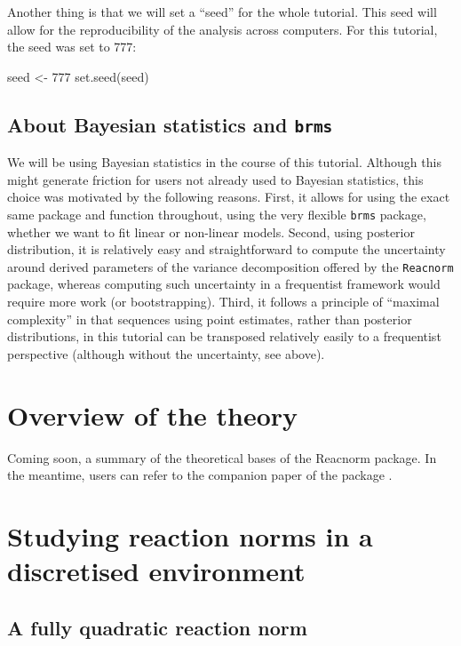 \documentclass[a4paper,12pt,twoside]{article}
\begin{document}
Another thing is that we will set a ``seed'' for the whole tutorial. This seed will allow for the reproducibility of the analysis across computers.
For this tutorial, the seed was set to 777:
\begin{Rinput}
seed <- 777
set.seed(seed)
\end{Rinput}

\subsection{About Bayesian statistics and \texttt{brms}}
\label{subsec_brms}

We will be using Bayesian statistics in the course of this tutorial. Although this might generate friction for users not already used to Bayesian statistics, this choice was motivated by the following reasons.
First, it allows for using the exact same package and function throughout, using the very flexible \texttt{brms} package, whether we want to fit linear or non-linear models.
Second, using posterior distribution, it is relatively easy and straightforward to compute the uncertainty around derived parameters of the variance decomposition offered by the \texttt{Reacnorm} package, whereas computing such uncertainty in a frequentist framework would require more work (or bootstrapping).
Third, it follows a principle of ``maximal complexity'' in that sequences using point estimates, rather than posterior distributions, in this tutorial can be transposed relatively easily to a frequentist perspective (although without the uncertainty, see above).


\section{Overview of the theory}

Coming soon, a summary of the theoretical bases of the Reacnorm package. In the meantime, users can refer to the companion paper of the package \autocite{devillemereuil_general_2016}.


\section{Studying reaction norms in a discretised environment}

\subsection{A fully quadratic reaction norm}
\end{document}
